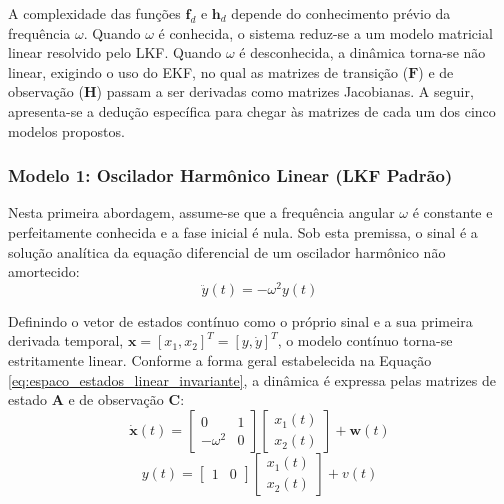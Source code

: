 \documentclass[a4paper,12pt]{article}
\begin{document}
A complexidade das funções $\mathbf{f}_d$ e $\mathbf{h}_d$ depende do conhecimento prévio da frequência $\omega$. Quando $\omega$ é conhecida, o sistema reduz-se a um modelo matricial linear resolvido pelo LKF. Quando $\omega$ é desconhecida, a dinâmica torna-se não linear, exigindo o uso do EKF, no qual as matrizes de transição ($\mathbf{F}$) e de observação ($\mathbf{H}$) passam a ser derivadas como matrizes Jacobianas. A seguir, apresenta-se a dedução específica para chegar às matrizes de cada um dos cinco modelos propostos.

\subsubsection{Modelo 1: Oscilador Harmônico Linear (LKF Padrão)}
\label{subsubsec:modelo1}

Nesta primeira abordagem, assume-se que a frequência angular $\omega$ é constante e perfeitamente conhecida e a fase inicial é nula. Sob esta premissa, o sinal é a solução analítica da equação diferencial de um oscilador harmônico não amortecido:
\begin{equation}
    \ddot{y}(t) = -\omega^2 y(t)
    \label{eq:mod1_edo}
\end{equation}

Definindo o vetor de estados contínuo como o próprio sinal e a sua primeira derivada temporal, $\mathbf{x} = [x_1, x_2]^T = [y, \dot{y}]^T$, o modelo contínuo torna-se estritamente linear. Conforme a forma geral estabelecida na Equação \eqref{eq:espaco_estados_linear_invariante}, a dinâmica é expressa pelas matrizes de estado $\mathbf{A}$ e de observação $\mathbf{C}$:
\begin{equation}
    \dot{\mathbf{x}}(t) = \begin{bmatrix} 0 & 1 \\ -\omega^2 & 0 \end{bmatrix} \begin{bmatrix} x_1(t) \\ x_2(t) \end{bmatrix} + \mathbf{w}(t)
    \label{eq:mod1_cont_dinamica}
\end{equation}
\begin{equation}
    y(t) = \begin{bmatrix} 1 & 0 \end{bmatrix} \begin{bmatrix} x_1(t) \\ x_2(t) \end{bmatrix} + v(t)
    \label{eq:mod1_cont_obs}
\end{equation}
\end{document}
